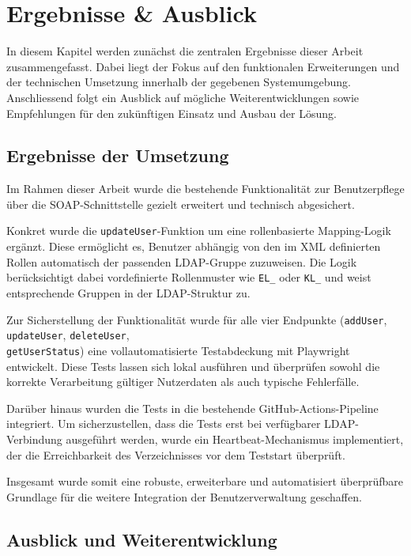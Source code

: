 \chapter{Ergebnisse \& Ausblick}
\vspace{-3em}
In diesem Kapitel werden zunächst die zentralen Ergebnisse dieser Arbeit zusammengefasst. Dabei liegt der Fokus auf den funktionalen Erweiterungen und der technischen Umsetzung innerhalb der gegebenen Systemumgebung. Anschliessend folgt ein Ausblick auf mögliche Weiterentwicklungen sowie Empfehlungen für den zukünftigen Einsatz und Ausbau der Lösung.


\section{Ergebnisse der Umsetzung}

Im Rahmen dieser Arbeit wurde die bestehende Funktionalität zur Benutzerpflege über die SOAP-Schnittstelle gezielt erweitert und technisch abgesichert. 

Konkret wurde die \texttt{updateUser}-Funktion um eine rollenbasierte Mapping-Logik ergänzt. Diese ermöglicht es, Benutzer abhängig von den im XML definierten Rollen automatisch der passenden LDAP-Gruppe zuzuweisen. Die Logik berücksichtigt dabei vordefinierte Rollenmuster wie \texttt{EL\_} oder \texttt{KL\_} und weist entsprechende Gruppen in der LDAP-Struktur zu.

Zur Sicherstellung der Funktionalität wurde für alle vier Endpunkte (\texttt{addUser}, \texttt{updateUser}, \texttt{deleteUser}, \\
\texttt{getUserStatus}) eine vollautomatisierte Testabdeckung mit Playwright entwickelt. Diese Tests lassen sich lokal ausführen und überprüfen sowohl die korrekte Verarbeitung gültiger Nutzerdaten als auch typische Fehlerfälle.

Darüber hinaus wurden die Tests in die bestehende GitHub-Actions-Pipeline integriert. Um sicherzustellen, dass die Tests erst bei verfügbarer LDAP-Verbindung ausgeführt werden, wurde ein Heartbeat-Mechanismus implementiert, der die Erreichbarkeit des Verzeichnisses vor dem Teststart überprüft.

Insgesamt wurde somit eine robuste, erweiterbare und automatisiert überprüfbare Grundlage für die weitere Integration der Benutzerverwaltung geschaffen.



\section{Ausblick und Weiterentwicklung}


